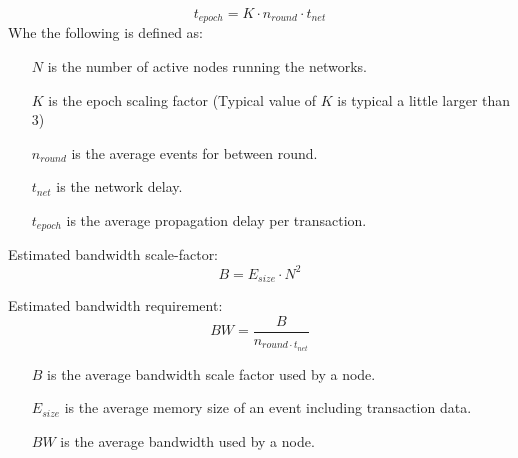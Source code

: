 \begin{equation}
t_{epoch} = K \cdot n_{round} \cdot t_{net}
\end{equation}
Whe the following is defined as:
\begin{itemize}
	\item[$N$] is the number of active nodes running the networks. 
	\item[$K$] is the epoch scaling factor (Typical value of $K$ is typical a little larger than 3)
	\item[$n_{round}$] is the average events for between round. 
	\item[$t_{net}$] is the network delay. 
	\item[$t_{epoch}$] is the average propagation delay per transaction. 
\end{itemize}


Estimated bandwidth scale-factor:
\begin{equation}
B = E_{size} \cdot N^2
\end{equation}

Estimated bandwidth requirement:
\begin{equation}
BW = \frac{B}{n_{round\cdot t_{net}}}
\end{equation}

\begin{itemize}
	\item[$B$] is the average bandwidth scale factor used by a node.
	\item[$E_{size}$] is the average memory size of an event including transaction data. 
	\item[$BW$] is the average bandwidth used by a node.
\end{itemize}

